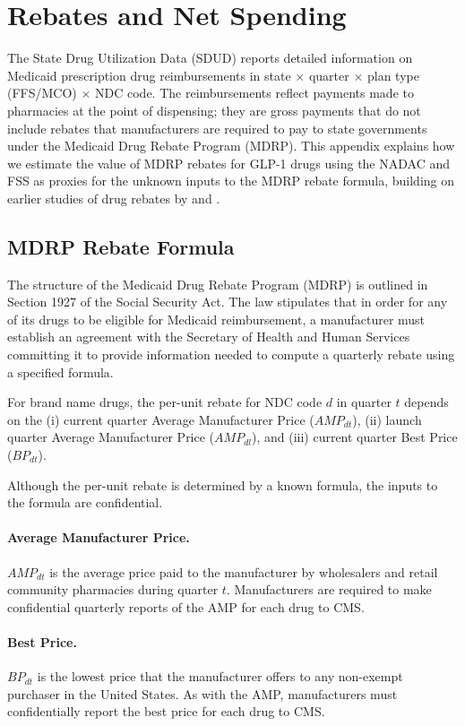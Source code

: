 \section{Rebates and Net Spending}\label{sec:appendix_b}

The State Drug Utilization Data (SDUD) reports detailed information on Medicaid prescription drug reimbursements in state $\times$ quarter $\times$ plan type (FFS/MCO) $\times$ NDC code. The reimbursements reflect payments made to pharmacies at the point of dispensing; they are gross payments that do not include rebates that manufacturers are required to pay to state governments under the Medicaid Drug Rebate Program (MDRP). This appendix explains how we estimate the value of MDRP rebates for GLP-1 drugs using the NADAC and FSS as proxies for the unknown inputs to the MDRP rebate formula, building on earlier studies of drug rebates by \citet{clemanscope2023bestprice} and \citet{cbo2021drugprices}.

\subsection{MDRP Rebate Formula}

The structure of the Medicaid Drug Rebate Program (MDRP) is outlined in Section 1927 of the Social Security Act. The law stipulates that in order for any of its drugs to be eligible for Medicaid reimbursement, a manufacturer must establish an agreement with the Secretary of Health and Human Services committing it to provide information needed to compute a quarterly rebate using a specified formula.

For brand name drugs, the per-unit rebate for NDC code $d$ in quarter $t$ depends on the (i) current quarter Average Manufacturer Price ($AMP_{dt}$), (ii) launch quarter Average Manufacturer Price ($AMP_{dl}$), and (iii) current quarter Best Price ($BP_{dt}$). 

Although the per-unit rebate is determined by a known formula, the inputs to the formula are confidential. 

\paragraph{Average Manufacturer Price.} $AMP_{dt}$ is the average price paid to the manufacturer by wholesalers and retail community pharmacies during quarter $t$. Manufacturers are required to make confidential quarterly reports of the AMP for each drug to CMS.

\paragraph{Best Price.} $BP_{dt}$ is the lowest price that the manufacturer offers to any non-exempt purchaser in the United States. As with the AMP, manufacturers must confidentially report the best price for each drug to CMS.

